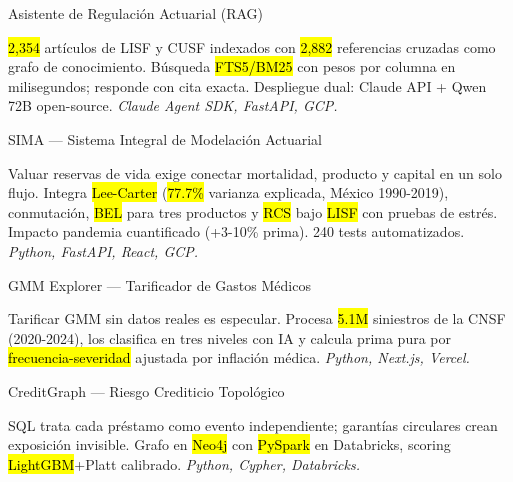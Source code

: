 \documentclass[10pt, letterpaper]{awesome-cv}
\begin{document}
\begin{cventries}

  \cventry
    {Asistente de Regulación Actuarial (RAG)}
    {}
    {}
    {}
    {
      \begin{cvitems}
        \item {\hl{2,354} artículos de LISF y CUSF indexados con \hl{2,882} referencias cruzadas como grafo de conocimiento. Búsqueda \hl{FTS5/BM25} con pesos por columna en milisegundos; responde con cita exacta. Despliegue dual: Claude API + Qwen 72B open-source. \textit{Claude Agent SDK, FastAPI, GCP.}}
      \end{cvitems}
    }

  \cventry
    {SIMA — Sistema Integral de Modelación Actuarial}
    {}
    {}
    {}
    {
      \begin{cvitems}
        \item {Valuar reservas de vida exige conectar mortalidad, producto y capital en un solo flujo. Integra \hl{Lee-Carter} (\hl{77.7\%} varianza explicada, México 1990-2019), conmutación, \hl{BEL} para tres productos y \hl{RCS} bajo \hl{LISF} con pruebas de estrés. Impacto pandemia cuantificado (+3-10\% prima). 240 tests automatizados. \textit{Python, FastAPI, React, GCP.}}
      \end{cvitems}
    }

  \cventry
    {GMM Explorer — Tarificador de Gastos Médicos}
    {}
    {}
    {}
    {
      \begin{cvitems}
        \item {Tarificar GMM sin datos reales es especular. Procesa \hl{5.1M} siniestros de la CNSF (2020-2024), los clasifica en tres niveles con IA y calcula prima pura por \hl{frecuencia-severidad} ajustada por inflación médica. \textit{Python, Next.js, Vercel.}}
      \end{cvitems}
    }

  \cventry
    {CreditGraph — Riesgo Crediticio Topológico}
    {}
    {}
    {}
    {
      \begin{cvitems}
        \item {SQL trata cada préstamo como evento independiente; garantías circulares crean exposición invisible. Grafo en \hl{Neo4j} con \hl{PySpark} en Databricks, scoring \hl{LightGBM}+Platt calibrado. \textit{Python, Cypher, Databricks.}}
      \end{cvitems}
    }

\end{cventries}
\end{document}
